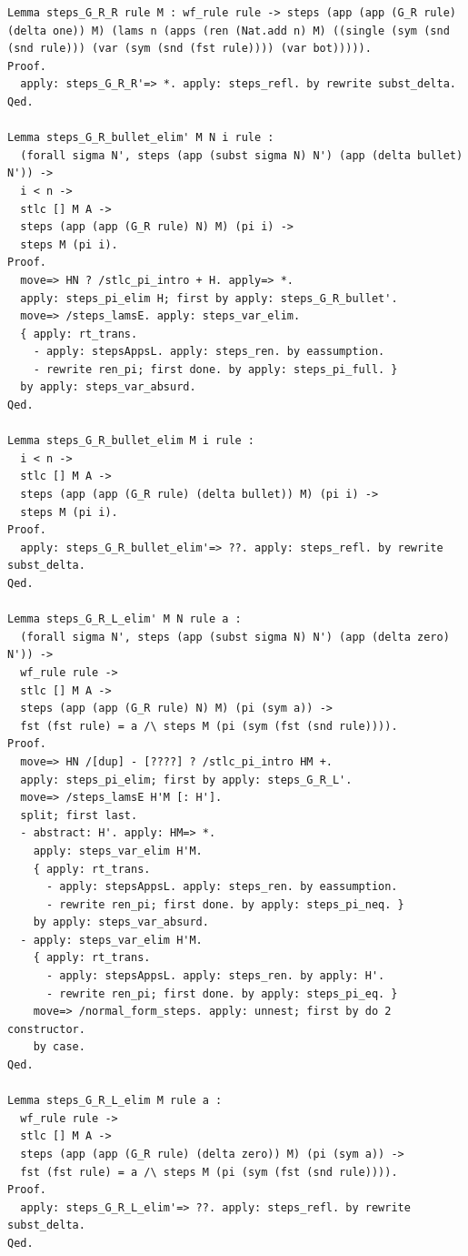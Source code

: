\begin{lstlisting}
Lemma steps_G_R_R rule M : wf_rule rule -> steps (app (app (G_R rule) (delta one)) M) (lams n (apps (ren (Nat.add n) M) ((single (sym (snd (snd rule))) (var (sym (snd (fst rule)))) (var bot))))).
Proof.
  apply: steps_G_R_R'=> *. apply: steps_refl. by rewrite subst_delta.
Qed.

Lemma steps_G_R_bullet_elim' M N i rule :
  (forall sigma N', steps (app (subst sigma N) N') (app (delta bullet) N')) ->
  i < n ->
  stlc [] M A ->
  steps (app (app (G_R rule) N) M) (pi i) ->
  steps M (pi i).
Proof.
  move=> HN ? /stlc_pi_intro + H. apply=> *.
  apply: steps_pi_elim H; first by apply: steps_G_R_bullet'.
  move=> /steps_lamsE. apply: steps_var_elim.
  { apply: rt_trans.
    - apply: stepsAppsL. apply: steps_ren. by eassumption.
    - rewrite ren_pi; first done. by apply: steps_pi_full. }
  by apply: steps_var_absurd.
Qed.

Lemma steps_G_R_bullet_elim M i rule :
  i < n ->
  stlc [] M A ->
  steps (app (app (G_R rule) (delta bullet)) M) (pi i) ->
  steps M (pi i).
Proof.
  apply: steps_G_R_bullet_elim'=> ??. apply: steps_refl. by rewrite subst_delta.
Qed.

Lemma steps_G_R_L_elim' M N rule a :
  (forall sigma N', steps (app (subst sigma N) N') (app (delta zero) N')) ->
  wf_rule rule ->
  stlc [] M A ->
  steps (app (app (G_R rule) N) M) (pi (sym a)) ->
  fst (fst rule) = a /\ steps M (pi (sym (fst (snd rule)))).
Proof.
  move=> HN /[dup] - [????] ? /stlc_pi_intro HM +.
  apply: steps_pi_elim; first by apply: steps_G_R_L'.
  move=> /steps_lamsE H'M [: H'].
  split; first last.
  - abstract: H'. apply: HM=> *.
    apply: steps_var_elim H'M.
    { apply: rt_trans.
      - apply: stepsAppsL. apply: steps_ren. by eassumption.
      - rewrite ren_pi; first done. by apply: steps_pi_neq. }
    by apply: steps_var_absurd.
  - apply: steps_var_elim H'M.
    { apply: rt_trans.
      - apply: stepsAppsL. apply: steps_ren. by apply: H'.
      - rewrite ren_pi; first done. by apply: steps_pi_eq. }
    move=> /normal_form_steps. apply: unnest; first by do 2 constructor.
    by case.
Qed.

Lemma steps_G_R_L_elim M rule a :
  wf_rule rule ->
  stlc [] M A ->
  steps (app (app (G_R rule) (delta zero)) M) (pi (sym a)) ->
  fst (fst rule) = a /\ steps M (pi (sym (fst (snd rule)))).
Proof.
  apply: steps_G_R_L_elim'=> ??. apply: steps_refl. by rewrite subst_delta.
Qed.


\end{lstlisting}
